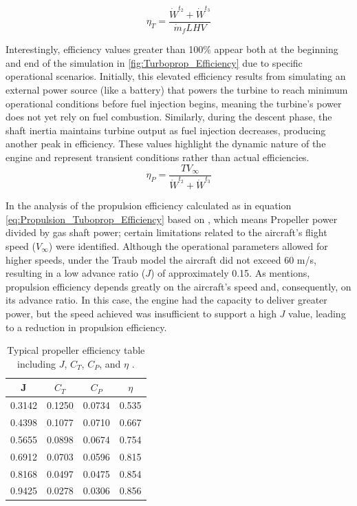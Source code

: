 \documentclass{Format}
\begin{document}
\begin{equation}\label{eq:Thermal_Tuboprop_Efficiency}
    \eta_{T} = \frac{\dot{W}^{t_2}+\dot{W}^{t_3}}{\dot{m}_{f}LHV}
\end{equation}


Interestingly, efficiency values greater than 100\% appear both at the beginning and end of the simulation in \autoref{fig:Turboprop_Efficiency} due to specific operational scenarios. Initially, this elevated efficiency results from simulating an external power source (like a battery) that powers the turbine to reach minimum operational conditions before fuel injection begins, meaning the turbine’s power does not yet rely on fuel combustion. Similarly, during the descent phase, the shaft inertia maintains turbine output as fuel injection decreases, producing another peak in efficiency. These values highlight the dynamic nature of the engine and represent transient conditions rather than actual efficiencies.
\begin{equation}\label{eq:Propulsion_Tuboprop_Efficiency}
    \eta_{P} = \frac{TV_{\infty}}{\dot{W}^{t_2}+\dot{W}^{t_3}}
\end{equation}

In the analysis of the propulsion efficiency calculated as in equation \ref{eq:Propulsion_Tuboprop_Efficiency} based on \cite{book:96630002}, which means Propeller power divided by gas shaft power; certain limitations related to the aircraft's flight speed (\( V_\infty \)) were identified. Although the operational parameters allowed for higher speeds, under the Traub model the aircraft did not exceed 60 m/s, resulting in a low advance ratio (\( J \)) of approximately 0.15. As \cite {book:96630002} mentions, propulsion efficiency depends greatly on the aircraft's speed and, consequently, on its advance ratio. In this case, the engine had the capacity to deliver greater power, but the speed achieved was insufficient to support a high \( J \) value, leading to a reduction in propulsion efficiency. 

\begin{table}[h!]
    \centering
    \begin{tabular}{|c|c|c|c|}
        \hline
        \textbf{J} & \textbf{$C_T$} & \textbf{$C_P$} & \textbf{$\eta$} \\
        \hline
        0.3142 & 0.1250 & 0.0734 & 0.535 \\
        0.4398 & 0.1077 & 0.0710 & 0.667 \\
        0.5655 & 0.0898 & 0.0674 & 0.754 \\
        0.6912 & 0.0703 & 0.0596 & 0.815 \\
        0.8168 & 0.0497 & 0.0475 & 0.854 \\
        0.9425 & 0.0278 & 0.0306 & 0.856 \\
        \hline
    \end{tabular}
    \vspace{10pt}
    \caption{Typical propeller efficiency table including $J$, $C_T$, $C_P$, and $\eta$ \cite{book:96630002}.}
    \label{tab:propeller_efficiency}
\end{table}
\end{document}
